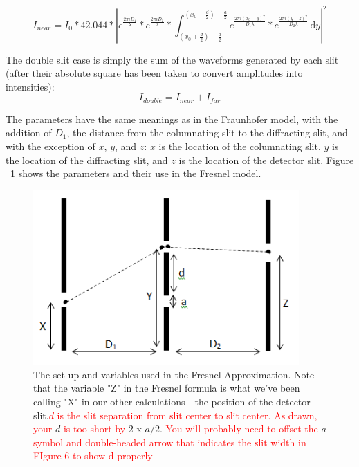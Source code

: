 \documentclass[prb,preprint]{revtex4-1}
\begin{document}
\begin{equation*}
I_{near}=I_{0}*42.044*|e^{\frac{2 \pi i D_{1}}{\lambda}}*e^{\frac{2 \pi i D_{2}}{\lambda}}*\int_{\left(x_{0}+\frac{d}{2}\right) - \frac{a}{2}}^{\left(x_{0}+\frac{d}{2}\right) + \frac{a}{2}} \! e^{\frac{2 \pi i (x_{0}-y)^{2}}{D_{1} \lambda}}*e^{\frac{2 \pi i (y-z)^{2}}{D_{2} \lambda}} \, \mathrm{d}y |^{2}
\end{equation*}

The double slit case is simply the sum of the waveforms generated by each slit (after their absolute square has been taken to convert amplitudes into intensities): 
\begin{equation}
I_{double}=I_{near}+I_{far}
\end{equation}


The parameters have the same meanings as in the Fraunhofer model, with the addition of $D_1$, the distance from the columnating slit to the diffracting slit, and with the exception of $x$, $y$, and $z$: $x$ is the location of the columnating slit, $y$ is the location of the diffracting slit, and $z$ is the location of the detector slit.  Figure ~\ref{Fresnel_diagram} shows the parameters and their use in the Fresnel model.  

\begin{figure}[h!]
\centering
\includegraphics[width=4in]{Fresnel_diagram.png}
\caption{The set-up and variables used in the Fresnel Approximation. Note that the variable "Z" in the Fresnel formula is what we've been calling "X" in our other calculations - the position of the detector slit.\textcolor{red}{$d$ is the slit separation from slit center to slit center. As drawn, your }$d$ \textcolor{red}{is too short by} 2 x $a/2$. \textcolor{red}{You will probably need to offset the} $a$ \textcolor{red}{symbol and double-headed arrow that indicates the slit width in FIgure 6 to show d properly}}
\label{Fresnel_diagram}
\end{figure}
\end{document}

